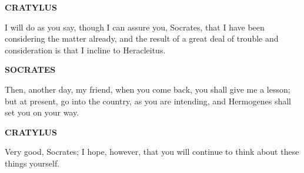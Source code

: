 \documentclass[11pt,letter]{article}
\begin{document}
\par \textbf{CRATYLUS}
\par   I will do as you say, though I can assure you, Socrates, that I have been considering the matter already, and the result of a great deal of trouble and consideration is that I incline to Heracleitus.

\par \textbf{SOCRATES}
\par   Then, another day, my friend, when you come back, you shall give me a lesson; but at present, go into the country, as you are intending, and Hermogenes shall set you on your way.

\par \textbf{CRATYLUS}
\par   Very good, Socrates; I hope, however, that you will continue to think about these things yourself.

\par 
\end{document}
